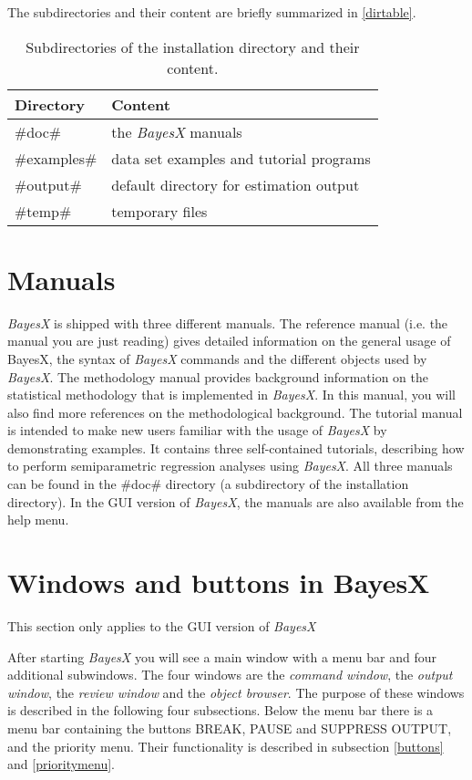 The subdirectories and their content are briefly summarized in \autoref{dirtable}.

\begin{table}[ht]
\begin{center}
\begin{tabular}{|l|l|}
\hline
Directory & Content \\
\hline
#doc# & the {\em BayesX} manuals \\
#examples# & data set examples and tutorial programs \\
#output# & default directory for estimation output \\
#temp# & temporary files \\
\hline
\end{tabular}
{\em\caption{ \label{dirtable} Subdirectories of the installation directory and their content.}}
\end{center}
\end{table}

\section{Manuals}\label{bayesxmanuals}

{\em BayesX} is shipped with three different manuals. The reference manual (i.e. the manual you are just reading) gives
detailed information on the general usage of BayesX, the syntax of {\em BayesX} commands and the different objects used by {\em
BayesX}. The methodology manual provides background information on the statistical methodology that is implemented in {\em
BayesX}. In this manual, you will also find more references on the methodological background. The tutorial manual is intended
to make new users familiar with the usage of {\em BayesX} by demonstrating examples. It contains three self-contained
tutorials, describing how to perform semiparametric regression analyses using {\em BayesX}. All three manuals can be found in
the #doc# directory (a subdirectory of the installation directory). In the GUI version of {\it BayesX}, the manuals are
also available from the help menu.

\section{Windows and buttons in BayesX}\label{bayesxwindows}

This section only applies to the GUI version of {\it BayesX}

After starting {\em BayesX} you will see a main window with a menu bar and four additional subwindows. The four windows are the
{\em command window}, the {\em output window}, the {\em review window} and the {\em object browser}. The purpose of these
windows is described in the following four subsections. Below the menu bar there is a menu bar containing the buttons BREAK,
PAUSE and SUPPRESS OUTPUT, and the priority menu. Their functionality is described in subsection \ref{buttons} and
\ref{prioritymenu}.

